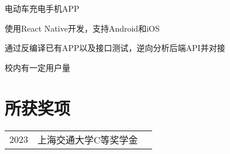 \documentclass[]{deedy-resume-openfont}
\begin{document}
\begin{minipage}[t]{0.73\textwidth}
\begin{tightemize}
    \item 电动车充电手机APP
    \item 使用React Native开发，支持Android和iOS
    \item 通过反编译已有APP以及接口测试，逆向分析后端API并对接
    \item 校内有一定用户量
\end{tightemize}
\sectionsep





\section{所获奖项} 
\begin{tabular}{rll}
2023         & 上海交通大学C等奖学金 \\
\end{tabular}
\sectionsep


% 
% 

\end{minipage} 
\end{document}
